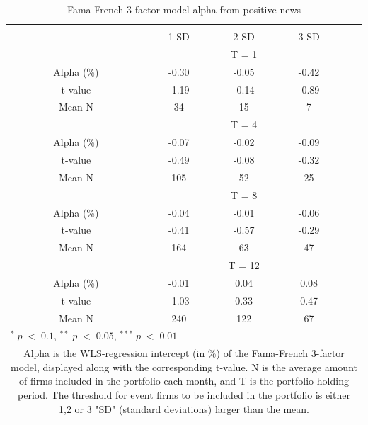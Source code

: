 \setlength{\tabcolsep}{15pt}
\begin{table}[]
\small
\centering
\caption{Fama-French 3 factor model alpha from positive news } 
\begin{tabular}{ccccccc}
\hline \hline \\ 
 &     &  &    1 SD  &  2 SD  &  3 SD  &  \\ \cline{4-6} 
& & & \multicolumn{3}{c}{ T = 1} & \\ \cline{2-6}
& Alpha (\%)  &  & -0.30  & -0.05  & -0.42 &  \\
& t-value &  & -1.19 & -0.14  & -0.89 & \\
& Mean N       &  &  34    & 15 & 7 &\\
& & & \multicolumn{3}{c}{ T = 4} & \\ \cline{2-6}
& Alpha (\%)  &  & -0.07  & -0.02  &  -0.09 & \\
& t-value &  & -0.49 & -0.08  & -0.32 & \\
& Mean N       &  & 105     & 52  & 25 & \\
& & & \multicolumn{3}{c}{ T = 8} & \\ \cline{2-6}
& Alpha (\%)  &  & -0.04   & -0.01  & -0.06 &  \\
& t-value &  & -0.41  & -0.57 & -0.29 & \\
& Mean N       &  & 164 & 63   & 47 & \\
&  & & \multicolumn{3}{c}{ T = 12} & \\ \cline{2-6}
& Alpha (\%)  &  & -0.01  & 0.04  & 0.08 &  \\
& t-value &  & -1.03  & 0.33 & 0.47 & \\
& Mean N       &  & 240    & 122  & 67 & \\ \hline \hline
 \multicolumn{7}{l}{ \footnotesize $^* \; p\; <\; 0.1$, $ ^{**} \; p\; <\; 0.05$, $ ^{***} \; p\; <\; 0.01$  } \\
 \multicolumn{7}{p{11.5cm}}{ \footnotesize Alpha is the WLS-regression intercept (in \%) of the Fama-French 3-factor model, displayed along with the corresponding t-value. N is the average amount of firms included in the portfolio each month, and T is the portfolio holding period. The threshold for event firms to be included in the portfolio is either 1,2 or 3 "SD" (standard deviations) larger than the mean.}  \\ 
\end{tabular}
\label{tab: FF3-pos}
\end{table}


